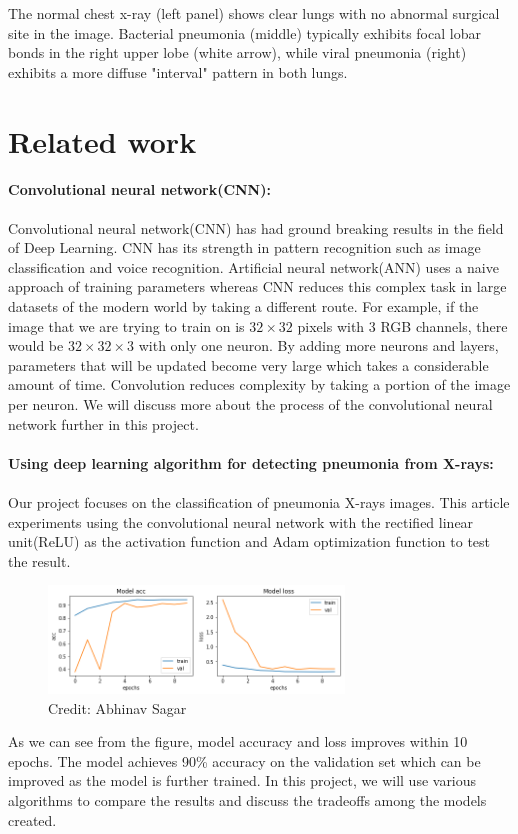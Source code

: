 \documentclass{article}
\begin{document}
The normal chest x-ray (left panel) shows clear lungs with no abnormal surgical site in the image. Bacterial pneumonia (middle) typically exhibits focal lobar bonds in the right upper lobe (white arrow), while viral pneumonia (right) exhibits a more diffuse "interval" pattern in both lungs.



\section{Related work}
\textbf{Convolutional neural network(CNN):}\\\\
Convolutional neural network(CNN) has had ground breaking results in the field of Deep Learning. CNN has its strength in pattern recognition such as image classification and voice recognition\cite{8308186}. Artificial neural network(ANN) uses a naive approach of training parameters whereas CNN reduces this complex task in large datasets of the modern world by taking a different route. For example, if the image that we are trying to train on is $32 \times 32$ pixels with 3 RGB channels, there would be $32 \times 32 \times 3$ with only one neuron. By adding more neurons and layers, parameters that will be updated become very large which takes a considerable amount of time. Convolution reduces complexity by taking a portion of the image per neuron. We will discuss more about the process of the convolutional neural network further in this project.
\\\\
\textbf{Using deep learning algorithm  for detecting pneumonia from X-rays:}\\\\
Our project focuses on the classification of pneumonia X-rays images. This article experiments using the convolutional neural network with the rectified linear unit(ReLU) as the activation function and Adam optimization function to test the result\cite{sagar_2019}. 
    \begin{figure}[H]
        \centering
    \includegraphics[width=0.7\textwidth]{figures/article_accuracy_loss.png}
    \caption{Credit: Abhinav Sagar}
    \end{figure}
As we can see from the figure, model accuracy and loss improves within 10 epochs. The model achieves 90\% accuracy on the validation set which can be improved as the model is further trained. In this project, we will use various algorithms to compare the results and discuss the tradeoffs among the models created.
\printbibliography
%
%
\end{document}

